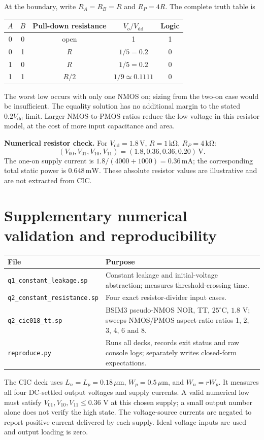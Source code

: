\documentclass[11pt,a4paper]{article}
\newcommand{\VDD}{V_{\mathrm{dd}}}
\begin{document}
At the boundary, write $R_A=R_B=R$ and $R_P=4R$. The complete truth table is
\begin{center}
\begin{tabular}{ccccc}
\toprule
$A$ & $B$ & Pull-down resistance & $V_o/\VDD$ & Logic \\
\midrule
0 & 0 & open & 1 & 1 \\
0 & 1 & $R$ & $1/5=0.2$ & 0 \\
1 & 0 & $R$ & $1/5=0.2$ & 0 \\
1 & 1 & $R/2$ & $1/9\simeq0.1111$ & 0 \\
\bottomrule
\end{tabular}
\end{center}
The worst low occurs with only one NMOS on; sizing from the two-on case
would be insufficient. The equality solution has no additional margin to
the stated $0.2\VDD$ limit. Larger NMOS-to-PMOS ratios reduce the low voltage
in this resistor model, at the cost of more input capacitance and area.

\textbf{Numerical resistor check.} For $\VDD=1.8\,\mathrm{V}$,
$R=1\,\mathrm{k\Omega}$, $R_P=4\,\mathrm{k\Omega}$:
\[
 (V_{00},V_{01},V_{10},V_{11})=(1.8,0.36,0.36,0.20)\,\mathrm{V}.
\]
The one-on supply current is $1.8/(4000+1000)=0.36\,\mathrm{mA}$;
the corresponding total static power is $0.648\,\mathrm{mW}$.
These absolute resistor values are illustrative and are not extracted from CIC.

\section*{Supplementary numerical validation and reproducibility}
\begin{center}
\begin{tabular}{p{.40\linewidth}p{.51\linewidth}}
\toprule
File & Purpose \\
\midrule
\texttt{q1\_constant\_leakage.sp} & Constant leakage and initial-voltage abstraction; measures threshold-crossing time. \\
\texttt{q2\_constant\_resistance.sp} & Four exact resistor-divider input cases. \\
\texttt{q2\_cic018\_tt.sp} & BSIM3 pseudo-NMOS NOR, TT, $25^\circ$C, $1.8$ V; sweeps NMOS/PMOS aspect-ratio ratios 1, 2, 3, 4, 6 and 8. \\
\texttt{reproduce.py} & Runs all decks, records exit status and raw console logs; separately writes closed-form expectations. \\
\bottomrule
\end{tabular}
\end{center}
The CIC deck uses $L_n=L_p=0.18\,\mu\mathrm{m}$, $W_p=0.5\,\mu\mathrm{m}$,
and $W_n=rW_p$. It measures all four DC-settled output voltages and supply
currents. A valid numerical low must satisfy $V_{01},V_{10},V_{11}\leq0.36$ V
at this chosen supply; a small output number alone does not verify the high state.
The voltage-source currents are negated to report positive current delivered
by each supply. Ideal voltage inputs are used and output loading is zero.
\end{document}
